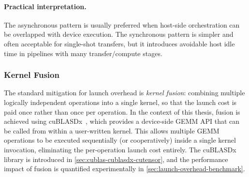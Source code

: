 \paragraph{Practical interpretation.}
The asynchronous pattern is usually preferred when host-side orchestration can
be overlapped with device execution. The synchronous pattern is simpler and
often acceptable for single-shot transfers, but it introduces avoidable host
idle time in pipelines with many transfer/compute stages.

\subsubsection{Kernel Fusion}\label{sec:kernel-fusion}

The standard mitigation for launch overhead is \emph{kernel fusion}: combining
multiple logically independent operations into a single kernel, so that the
launch cost is paid once rather than once per operation. In the context of this
thesis, fusion is achieved using cuBLASDx~\cite{cublasdx}, which provides a
device-side GEMM API that can be called from within a user-written kernel. This
allows multiple GEMM operations to be executed sequentially (or cooperatively)
inside a single kernel invocation, eliminating the per-operation launch cost
entirely. The cuBLASDx library is introduced in
\cref{sec:cublas-cublasdx-cutensor}, and the performance impact of fusion is
quantified experimentally in \cref{sec:launch-overhead-benchmark}.
